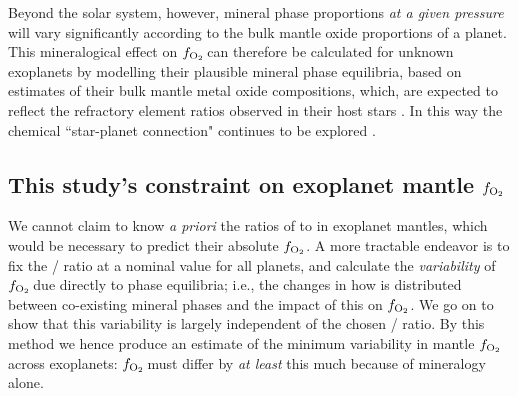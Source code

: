 \documentclass[fleqn,usenatbib,twocolumn]{mnras}
\newcommand{\fo}{$f_{\ce{O2}}$}
\newcommand{\todo}[1]{\textit{\textcolor{violet}{{#1}}}}
\begin{document}
Beyond the solar system, however, mineral phase proportions \textit{at a given pressure} will vary significantly according to the bulk mantle oxide proportions of a planet. This mineralogical effect on \fo\,can therefore be calculated for unknown exoplanets by modelling their plausible mineral phase equilibria, based on estimates of their bulk mantle metal oxide compositions, which, are expected to reflect the refractory element ratios observed in their host stars \citep{anders_solar-system_1982, thiabaud_elemental_2015, bonsor_host-star_2021}. In this way the chemical ``star-planet connection" \citep{hinkel_starplanet_2018} continues to be explored \citep[e.g.,][]{unterborn_thorium_2015, dorn_can_2015, dorn_generalized_2017, dorn_bayesian_2017, santos_constraining_2017, dorn_new_2019, unterborn_effects_2017, unterborn_pressure_2019, putirka_composition_2019, wang_enhanced_2019, wang_detailed_2022, otegi_impact_2020, spaargaren_influence_2020, spaargaren_plausible_2022, guimond_mantle_2023, unterborn_nominal_2023, unterborn_mantle_2022}. 






 




\subsection{This study's constraint on exoplanet mantle \fo}

We cannot claim to know \textit{a priori} the ratios of  to  in exoplanet mantles, which would be necessary to predict their absolute \fo. A more tractable endeavor is to fix the / ratio at a nominal value for all planets, and calculate the \textit{variability} of \fo\,due directly to phase equilibria; i.e., the changes in how  is distributed between co-existing mineral phases and the impact of this on \fo. We go on to show that this variability is largely independent of the chosen / ratio. By this method we hence produce an estimate of the minimum variability in mantle \fo\,across exoplanets: \fo\,must differ by \textit{at least} this much because of mineralogy alone.
\end{document}
